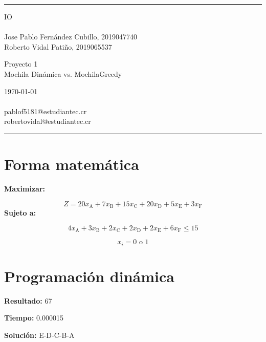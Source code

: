 \documentclass[a4paper]{article}
\begin{document}

\fancyhead[C]{}
\hrule \medskip %
\begin{minipage}{0.295\textwidth} %
\raggedright
IO\\ %
\footnotesize %
\hfill\\
Jose Pablo Fernández Cubillo, 2019047740 \\%
Roberto Vidal Patiño, 2019065537%
\end{minipage}
\begin{minipage}{0.4\textwidth} %
\centering 
\large %
Proyecto 1\\ %
\normalsize %
Mochila Dinámica vs. MochilaGreedy\\ %
\end{minipage}
\begin{minipage}{0.295\textwidth} %
\raggedleft
\today\\ %
\footnotesize %
\hfill\\
pablof5181@estudiantec.cr\\
robertovidal@estudiantec.cr%
\end{minipage}
\medskip\hrule %
\bigskip

\section{Forma matemática}
 \textbf{Maximizar:}

$$Z=20x_{\text{A}}+7x_{\text{B}}+15x_{\text{C}}+20x_{\text{D}}+5x_{\text{E}}+3x_{\text{F}}$$\textbf{Sujeto a:}

$$4x_{\text{A}}+3x_{\text{B}}+2x_{\text{C}}+2x_{\text{D}}+2x_{\text{E}}+6x_{\text{F}}\leq 15$$

$$x_i = 0 \text{ o } 1$$\section{Programación dinámica}
\textbf{Resultado:} 67

\textbf{Tiempo:} 0.000015

\textbf{Solución:} E-D-C-B-A
\end{document}
